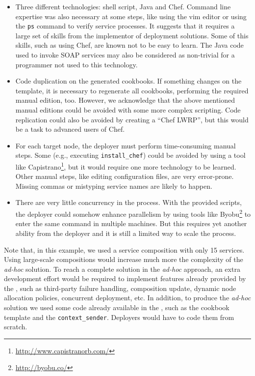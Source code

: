 \begin{itemize}

\item Three different technologies:
shell script, Java and Chef.
Command line expertise was also necessary at some steps,
like using the vim editor or using the \texttt{ps} command
to verify service processes.
It suggests that it requires a large set of skills 
from the implementor of deployment solutions.
Some of this skills, such as using Chef, are known not to be easy to learn.
The Java code used to invoke SOAP services may also be considered as
non-trivial for a programmer not used to this technology.

\item Code duplication on the generated cookbooks.
If something changes on the template, it is necessary to regenerate all cookbooks,
performing the required manual edition, too.
However, we acknowledge that the above mentioned manual editions 
could be avoided with some more complex scripting.
Code replication could  also be avoided by creating a ``Chef LWRP'',
but this would be a task to advanced users of Chef.

\item For each target node, the deployer must perform time-consuming manual steps.
Some (e.g., executing \texttt{install\_chef}) could be avoided
by using a tool like Capistrano\footnote{\url{http://www.capistranorb.com/}}, 
but it would require one more technology to be learned.
Other manual steps, like editing configuration files, are very error-prone.
Missing commas or mistyping service names are likely to happen.

\item There are very little concurrency in the process. 
With the provided scripts, the deployer could somehow enhance parallelism
by using tools like Byobu\footnote{\url{http://byobu.co/}} 
to enter the same command in multiple machines.
But this requires yet another ability from the deployer 
and it is still a limited way to scale the process.

\end{itemize}

Note that, in this example, we used a service composition with only 15 services.
Using large-scale compositions would increase much more
the complexity of the \emph{ad-hoc} solution.
To reach a complete solution in the \emph{ad-hoc} approach, 
an extra development effort would be required 
to implement features already provided by the \ee,
such as third-party failure handling,
composition update, dynamic node allocation policies,
concurrent deployment, etc.
In addition, to produce the \emph{ad-hoc} solution we used some code already 
available in the \ee, such as the cookbook template and
the \texttt{context\_sender}. Deployers would have to code them from scratch.

